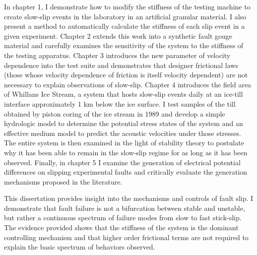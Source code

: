 \documentclass[11pt]{psuthesis}
\begin{document}
\begin{frontmatter}
In chapter 1, I demonstrate how to modify the stiffness of the testing machine to create slow-slip events in the laboratory in an artificial granular material. I also present a method to automatically calculate the stiffness of each slip event in a given experiment. Chapter 2 extends this work into a synthetic fault gouge material and carefully examines the sensitivity of the system to the stiffness of the testing apparatus. Chapter 3 introduces the new parameter of velocity dependence into the test suite and demonstrates that designer frictional laws (those whose velocity dependence of friction is itself velocity dependent) are not necessary to explain observations of slow-slip. Chapter 4 introduces the field area of Whillans Ice Stream, a system that hosts slow-slip events daily at an ice-till interface approximately 1 km below the ice surface. I test samples of the till obtained by piston coring of the ice stream in 1989 and develop a simple hydrologic model to determine the potential stress states of the system and an effective medium model to predict the acoustic velocities under those stresses. The entire system is then examined in the light of stability theory to postulate why it has been able to remain in the slow-slip regime for as long as it has been observed. Finally, in chapter 5 I examine the generation of electrical potential differences on slipping experimental faults and critically evaluate the generation mechanisms proposed in the literature.

This dissertation provides insight into the mechanisms and controls of fault slip. I demonstrate that fault failure is not a bifurcation between stable and unstable, but rather a continuous spectrum of failure modes from slow to fast stick-slip. The evidence provided shows that the stiffness of the system is the dominant controlling mechanism and that higher order frictional terms are not required to explain the basic spectrum of behaviors observed.




\tables



\end{frontmatter}
\end{document}
